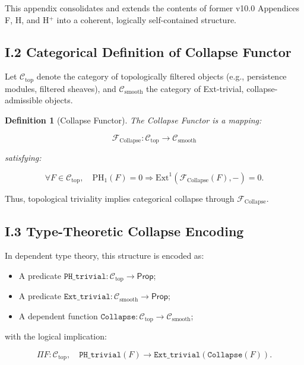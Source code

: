 \documentclass[11pt]{article}
\newtheorem{definition}[theorem]{Definition}
\begin{document}
This appendix consolidates and extends the contents of former v10.0 Appendices F, H, and H$^+$ into a coherent, logically self-contained structure.

\subsection*{I.2 Categorical Definition of Collapse Functor}

Let \( \mathcal{C}_{\mathrm{top}} \) denote the category of topologically filtered objects (e.g., persistence modules, filtered sheaves), and \( \mathcal{C}_{\mathrm{smooth}} \) the category of Ext-trivial, collapse-admissible objects.

\begin{definition}[Collapse Functor]
The \emph{Collapse Functor} is a mapping:

\[
\mathcal{F}_{\mathrm{Collapse}} : \mathcal{C}_{\mathrm{top}} \to \mathcal{C}_{\mathrm{smooth}}
\]

satisfying:

\[
\forall F \in \mathcal{C}_{\mathrm{top}}, \quad \mathrm{PH}_1(F) = 0 \Rightarrow \mathrm{Ext}^1(\mathcal{F}_{\mathrm{Collapse}}(F), -) = 0.
\]
\end{definition}

Thus, topological triviality implies categorical collapse through \( \mathcal{F}_{\mathrm{Collapse}} \).

\subsection*{I.3 Type-Theoretic Collapse Encoding}

In dependent type theory, this structure is encoded as:

\begin{itemize}
    \item A predicate \( \texttt{PH\_trivial} : \mathcal{C}_{\mathrm{top}} \to \mathsf{Prop} \);
    \item A predicate \( \texttt{Ext\_trivial} : \mathcal{C}_{\mathrm{smooth}} \to \mathsf{Prop} \);
    \item A dependent function \( \texttt{Collapse} : \mathcal{C}_{\mathrm{top}} \to \mathcal{C}_{\mathrm{smooth}} \);
\end{itemize}

with the logical implication:

\[
\Pi F : \mathcal{C}_{\mathrm{top}}, \quad \texttt{PH\_trivial}(F) \to \texttt{Ext\_trivial}(\texttt{Collapse}(F)).
\]
\end{document}

